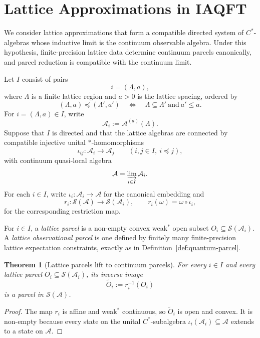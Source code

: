 \documentclass[11pt]{article}
\newtheorem{theorem}{Theorem}[section]
\begin{document}
\section{Lattice Approximations in IAQFT}
\label{sec:lattice}

We consider lattice approximations that form a compatible directed system
of $C^*$-algebras whose inductive limit is the continuum observable
algebra. Under this hypothesis, finite-precision lattice data determine
continuum parcels canonically, and parcel reduction is compatible with
the continuum limit.

Let $I$ consist of pairs
\[
i=(\Lambda,a),
\]
where $\Lambda$ is a finite lattice region and $a>0$ is the lattice
spacing, ordered by
\[
(\Lambda,a)\preceq(\Lambda',a')
\quad\Longleftrightarrow\quad
\Lambda\subseteq\Lambda'
\ \text{and}\ 
a'\leq a.
\]
For $i=(\Lambda,a)\in I$, write
\[
\mathcal A_i:=\mathcal A^{(a)}(\Lambda).
\]
Suppose that $I$ is directed and that the lattice algebras are connected
by compatible injective unital $*$-homomorphisms
\[
\iota_{ij}:\mathcal A_i\longrightarrow\mathcal A_j
\qquad(i,j\in I,\ i\preceq j),
\]
with continuum quasi-local algebra
\[
\mathcal A=\varinjlim_{i\in I}\mathcal A_i.
\]
For each $i\in I$, write
$\iota_i:\mathcal A_i\to\mathcal A$ for the canonical embedding and
\[
r_i:\mathcal S(\mathcal A)\longrightarrow\mathcal S(\mathcal A_i),
\qquad
r_i(\omega)=\omega\circ\iota_i,
\]
for the corresponding restriction map.

For $i\in I$, a \emph{lattice parcel} is a non-empty convex weak$^*$ open
subset $O_i\subseteq\mathcal S(\mathcal A_i)$. A \emph{lattice
observational parcel} is one defined by finitely many finite-precision
lattice expectation constraints, exactly as in
Definition~\ref{def:quantum-parcel}.

\begin{theorem}[Lattice parcels lift to continuum parcels]
\label{thm:latticeparcel}
For every $i\in I$ and every lattice parcel
$O_i\subseteq\mathcal S(\mathcal A_i)$, its inverse image
\[
\widetilde O_i:=r_i^{-1}(O_i)
\]
is a parcel in $\mathcal S(\mathcal A)$.
\end{theorem}

\begin{proof}
The map $r_i$ is affine and weak$^*$ continuous, so $\widetilde O_i$ is
open and convex. It is non-empty because every state on the unital
$C^*$-subalgebra $\iota_i(\mathcal A_i)\subseteq\mathcal A$ extends to a
state on $\mathcal A$.
\end{proof}
\end{document}
